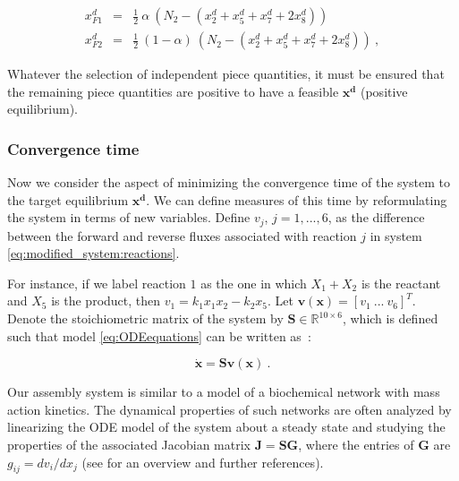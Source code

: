 		\begin{eqnarray}
			x_{F1}^d &=& \tfrac{1}{2}~ \alpha ~\left(N_2-(x_2^d+x_5^d+x_7^d+2 x_8^d)\right)~ \\
			x_{F2}^d &=& \tfrac{1}{2}~ (1-\alpha) ~\left(N_2-(x_2^d+x_5^d+x_7^d+2 x_8^d)\right)~,
		\end{eqnarray}

		Whatever the selection of independent piece quantities, it must be
		ensured that the remaining piece quantities are positive to have a
		feasible $\mathbf{x^d}$ (positive equilibrium).
		
		
		\subsubsection{Convergence time} %
		\label{ssub:convergence_time}
		
		Now we consider the aspect of minimizing the convergence time of the
		system to the target equilibrium $\mathbf{x^d}$.  We can define
		measures of this time by reformulating the system in terms of new
		variables.  Define $v_j$, $j=1,...,6$, as the difference between
		the forward and reverse fluxes associated with reaction $j$ in
		system \eqref{eq:modified_system:reactions}.
		
		For instance, if we label reaction $1$ as the one in which $X_1 + X_2$ is the
		reactant and $X_5$ is the product, then $v_1 = k_1 x_1 x_2 - k_2
		x_5$.  Let $\mathbf{v(x)} = [v_1~...~v_{6}]^T$.  Denote the
		stoichiometric matrix of the system by $\mathbf{S} \in
		\mathbb{R}^{10 \times 6}$, which is defined such that model
		\eqref{eq:ODEequations} can be written as~\cite{bib:Heinrich1996}:

		\begin{equation}
			\mathbf{\dot{x}} = \mathbf{S} \mathbf{v(x)}~.
		\end{equation}


		Our assembly system is similar to a model of a biochemical network
		with mass action kinetics.  The dynamical properties of such
		networks are often analyzed by linearizing the ODE model of the
		system about a steady state and studying the properties of the
		associated Jacobian matrix $\mathbf{J} = \mathbf{S} \mathbf{G}$,
		where the entries of $\mathbf{G}$ are $g_{ij} = dv_i/dx_j$ (see
		\cite{bib:Jamshidi2008} for an overview and further references).
		
